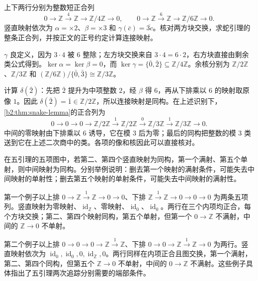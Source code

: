 \begin{exercise}\label{b2:ex:03-snake-arithmetic}
	上下两行分别为整数短正合列
	\[
		0\longrightarrow\mathbb Z\xrightarrow{4}\mathbb Z\longrightarrow\mathbb Z/4\mathbb Z\longrightarrow0, \qquad 0\longrightarrow\mathbb Z\xrightarrow{6}\mathbb Z\longrightarrow\mathbb Z/6\mathbb Z\longrightarrow0.
	\]
	竖直映射依次为 \(\alpha=\times2\)、\(\beta=\times3\) 和 \(\gamma(\bar c)=\overline{3c}\)。核对两方块交换，求蛇引理的整条正合列，并按正文的正号约定计算连接映射。
\end{exercise}
\begin{solution}
	\(\gamma\) 良定义，因为 \(3\cdot4\) 被 \(6\) 整除；左方块交换来自 \(3\cdot4=6\cdot2\)，右方块直接由剩余类公式得到。\(\ker\alpha=\ker\beta=0\)，而 \(\ker\gamma=\{\bar0,\bar2\}\subseteq\mathbb Z/4\mathbb Z\)。余核分别为 \(\mathbb Z/2\mathbb Z\)、\(\mathbb Z/3\mathbb Z\) 和 \((\mathbb Z/6\mathbb Z)/\{\bar0,\bar3\}\cong\mathbb Z/3\mathbb Z\)。

	计算 \(\delta(\bar2)\)：先把 \(\bar2\) 提升为中项整数 \(2\)，经 \(\beta\) 得 \(6\)，再从下排乘以 \(6\) 的映射取原像 \(1\)。因此 \(\delta(\bar2)=\bar1\in\mathbb Z/2\mathbb Z\)，所以连接映射是同构。在上述识别下，\cref{b2:thm:snake-lemma}的正合列为
	\[
		0\longrightarrow0\longrightarrow0\longrightarrow\mathbb Z/2\mathbb Z \xrightarrow{\,1\,}\mathbb Z/2\mathbb Z \xrightarrow{\,0\,}\mathbb Z/3\mathbb Z \xrightarrow{\,1\,}\mathbb Z/3\mathbb Z\longrightarrow0.
	\]
	中间的零映射由下排乘以 \(6\) 诱导，它在模 \(3\) 后为零；最后的同构把整数的模 \(3\) 类送到它在上述二次商中的类。各项的像和核因此可以直接核对。
\end{solution}

\begin{exercise}\label{b2:ex:03-five-lemma-hypotheses}
	在五引理的五项图中，若第二、第四个竖直映射为同构，第一个满射、第五个单射，则中间映射为同构。分别举例说明：删去第一个映射的满射条件，可能失去中间映射的单射性；删去第五个映射的单射条件，可能失去中间映射的满射性。
\end{exercise}
\begin{solution}
	第一个例子以上排 \(0\to\mathbb Z\xrightarrow{1}\mathbb Z\to0\to0\)、下排 \(\mathbb Z\xrightarrow{1}\mathbb Z\to0\to0\to0\) 为两条五项列。竖直映射为零映射、\(\operatorname{id}_{\mathbb Z}\)、零映射、\(\operatorname{id}_0\)、\(\operatorname{id}_0\)。两行在三个内项均正合，每个方块交换；第二、第四个映射同构，第五个单射，但第一个 \(0\to\mathbb Z\) 不满射，中间的 \(\mathbb Z\to0\) 不单射。

	第二个例子以上排 \(0\to0\to0\to\mathbb Z\xrightarrow{1}\mathbb Z\)、下排 \(0\to0\to\mathbb Z\xrightarrow{1}\mathbb Z\to0\) 为两行。竖直映射依次为 \(\operatorname{id}_0,\operatorname{id}_0,0,\operatorname{id}_{\mathbb Z},0\)。两行同样在内项正合且图交换，第一个满射，第二、第四个同构，但第五个 \(\mathbb Z\to0\) 不单射，中间的 \(0\to\mathbb Z\) 不满射。这些例子具体指出了五引理两次追踪分别需要的端部条件。
\end{solution}

